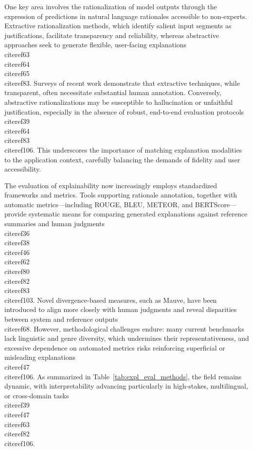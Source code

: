 \documentclass[11pt]{article}
\begin{document}
One key area involves the rationalization of model outputs through the expression of predictions in natural language rationales accessible to non-experts. Extractive rationalization methods, which identify salient input segments as justifications, facilitate transparency and reliability, whereas abstractive approaches seek to generate flexible, user-facing explanations \\cite{ref63}\\cite{ref64}\\cite{ref65}\\cite{ref83}. Surveys of recent work demonstrate that extractive techniques, while transparent, often necessitate substantial human annotation. Conversely, abstractive rationalizations may be susceptible to hallucination or unfaithful justification, especially in the absence of robust, end-to-end evaluation protocols \\cite{ref39}\\cite{ref64}\\cite{ref83}\\cite{ref106}. This underscores the importance of matching explanation modalities to the application context, carefully balancing the demands of fidelity and user accessibility.

The evaluation of explainability now increasingly employs standardized frameworks and metrics. Tools supporting rationale annotation, together with automatic metrics—including ROUGE, BLEU, METEOR, and BERTScore—provide systematic means for comparing generated explanations against reference summaries and human judgments \\cite{ref36}\\cite{ref38}\\cite{ref46}\\cite{ref62}\\cite{ref80}\\cite{ref82}\\cite{ref83}\\cite{ref103}. Novel divergence-based measures, such as Mauve, have been introduced to align more closely with human judgments and reveal disparities between system and reference outputs \\cite{ref68}. However, methodological challenges endure: many current benchmarks lack linguistic and genre diversity, which undermines their representativeness, and excessive dependence on automated metrics risks reinforcing superficial or misleading explanations \\cite{ref47}\\cite{ref106}. As summarized in Table~\ref{tab:expl_eval_methods}, the field remains dynamic, with interpretability advancing particularly in high-stakes, multilingual, or cross-domain tasks \\cite{ref39}\\cite{ref47}\\cite{ref63}\\cite{ref82}\\cite{ref106}.
\end{document}
